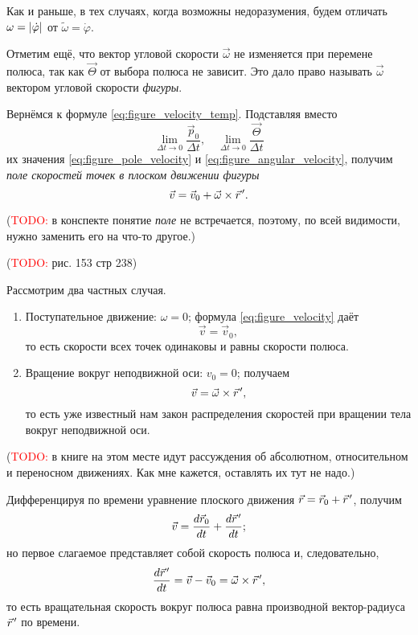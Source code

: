 Как и раньше, в тех случаях, когда возможны недоразумения, будем отличать
$\omega = \left|\dot{\varphi}\right|$ от $\tilde{\omega} = \dot{\varphi}$.

Отметим ещё, что вектор угловой скорости $\vec{\omega}$ не изменяется при
перемене полюса, так как $\vec{\Theta}$ от выбора полюса не зависит. Это дало
право называть $\vec{\omega}$ вектором угловой скорости \textit{фигуры}.

Вернёмся к формуле \ref{eq:figure_velocity_temp}. Подставляя вместо
\begin{equation*}
  \lim_{\Delta t \to 0} \frac{\vec{p}_0}{\Delta t}, \quad \lim_{\Delta t \to 0}
  \frac{\vec{\Theta}}{\Delta t}
\end{equation*}
их значения \ref{eq:figure_pole_velocity} и \ref{eq:figure_angular_velocity},
получим \textit{поле скоростей точек в плоском движении фигуры}
\begin{equation}
  \label{eq:figure_velocity}
  \vec{v} = \vec{v}_0 + \crossprod{\vec{\omega}}{\pvec{r}}.
\end{equation}

(\textcolor{red}{TODO:} в конспекте понятие \textit{поле} не встречается,
поэтому, по всей видимости, нужно заменить его на что-то другое.)

(\textcolor{red}{TODO:} рис. 153 стр 238)

Рассмотрим два частных случая.
\begin{enumerate}
  \item Поступательное движение: $\omega = 0$; формула \ref{eq:figure_velocity}
    даёт
    \begin{equation*}
      \vec{v} = \vec{v}_0,
    \end{equation*}
    то есть скорости всех точек одинаковы и равны скорости полюса.

  \item Вращение вокруг неподвижной оси: $v_0 = 0$; получаем
    \begin{equation*}
      \vec{v} = \crossprod{\vec{\omega}}{\pvec{r}},
    \end{equation*}
    то есть уже известный нам закон распределения скоростей при вращении тела
    вокруг неподвижной оси.
\end{enumerate}

(\textcolor{red}{TODO:} в книге на этом месте идут рассуждения об абсолютном,
относительном и переносном движениях. Как мне кажется, оставлять их тут не
надо.)

Дифференцируя по времени уравнение плоского движения $\vec{r} = \vec{r}_0 +
\pvec{r}$, получим
\begin{equation*}
  \vec{v} = \dt[\vec{r}_0] + \dt[\pvec{r}];
\end{equation*}
но первое слагаемое представляет собой скорость полюса и, следовательно,
\begin{equation}
  \label{eq:rotational_velocity}
  \dt[\pvec{r}] = \vec{v} - \vec{v}_0 = \crossprod{\vec{\omega}}{\pvec{r}},
\end{equation}
то есть вращательная скорость вокруг полюса равна производной вектор-радиуса
$\pvec{r}$ по времени.


